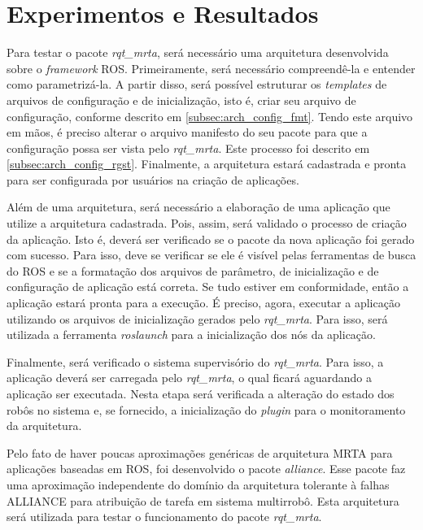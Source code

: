 \chapter[Experimentos e Resultados]{Experimentos e Resultados} \label{cap:resultados}
    Para testar o pacote \textit{rqt\_mrta}, será necessário uma arquitetura desenvolvida sobre o \textit{framework} ROS. Primeiramente, será necessário compreendê-la e entender como parametrizá-la. A partir disso, será possível estruturar os \textit{templates} de arquivos de configuração e de inicialização, isto é, criar seu arquivo de configuração, conforme descrito em \ref{subsec:arch_config_fmt}. Tendo este arquivo em mãos, é preciso alterar o arquivo manifesto do seu pacote para que a configuração possa ser vista pelo \textit{rqt\_mrta}. Este processo foi descrito em \ref{subsec:arch_config_rgst}. Finalmente, a arquitetura estará cadastrada e pronta para ser configurada por usuários na criação de aplicações.
    
    Além de uma arquitetura, será necessário a elaboração de uma aplicação que utilize a arquitetura cadastrada. Pois, assim, será validado o processo de criação da aplicação. Isto é, deverá ser verificado se o pacote da nova aplicação foi gerado com sucesso. Para isso, deve se verificar se ele é visível pelas ferramentas de busca do ROS e se a formatação dos arquivos de parâmetro, de inicialização e de configuração de aplicação está correta. Se tudo estiver em conformidade, então a aplicação estará pronta para a execução. É preciso, agora, executar a aplicação utilizando os arquivos de inicialização gerados pelo \textit{rqt\_mrta}. Para isso, será utilizada a ferramenta \textit{roslaunch} para a inicialização dos nós da aplicação. 
    
    Finalmente, será verificado o sistema supervisório do \textit{rqt\_mrta}. Para isso, a aplicação deverá ser carregada pelo \textit{rqt\_mrta}, o qual ficará aguardando a aplicação ser executada. Nesta etapa será verificada a alteração do estado dos robôs no sistema e, se fornecido, a inicialização do \textit{plugin} para o monitoramento da arquitetura.
    
    Pelo fato de haver poucas aproximações genéricas de arquitetura MRTA para aplicações baseadas em ROS, foi desenvolvido o pacote \textit{alliance}. Esse pacote faz uma aproximação independente do domínio da arquitetura tolerante à falhas ALLIANCE \cite{ref:parker1998alliance} para atribuição de tarefa em sistema multirrobô. Esta arquitetura será utilizada para testar o funcionamento do pacote \textit{rqt\_mrta}. 
    

